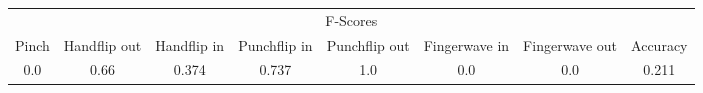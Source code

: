 \documentclass{standalone}
\begin{document}
 
 \begin{tabular}{|c|c|c|c|c|c|c ||c|}
\cline{1-8}\multicolumn{8}{|c|}{F-Scores} \\ 
\cline{1-8}Pinch & Handflip out & Handflip in & Punchflip in & Punchflip out & Fingerwave in & Fingerwave out & Accuracy\\ 
\cline{1-8}0.0 & 0.66 & 0.374 & 0.737 & 1.0 & 0.0 & 0.0 & 0.211\\ 
 \cline{1-8}\hline \end{tabular}
 
\end{document}
